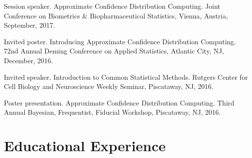 \documentclass[margin,line]{res}
\begin{document}
\begin{resume}

Session speaker. Approximate Confidence Distribution Computing.  Joint Conference on Biometrics \& Biopharmaceutical Statistics, Vienna, Austria, September, 2017.   




Invited poster. Introducing Approximate Confidence Distribution Computing.  72nd Annual Deming Conference on Applied Statistics, Atlantic City, NJ, December, 2016. 

Invited speaker. Introduction to Common Statistical Methods. Rutgers Center for Cell Biology and Neuroscience Weekly Seminar, Piscataway, NJ, 2016.



Poster presentation. Approximate Confidence Distribution Computing. Third Annual Bayesian, Frequentist, Fiducial Workshop, Piscataway, NJ, 2016.  


\section{\sc Educational Experience}
\vspace{-.3cm}

\end{resume}
\end{document}
